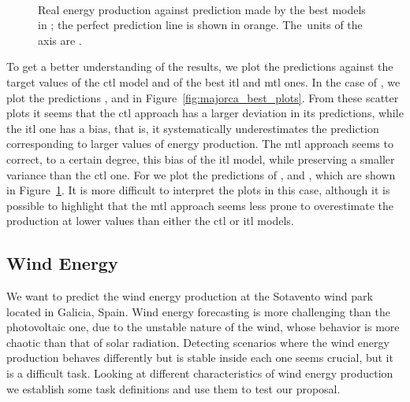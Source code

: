\begin{figure}[t!]
    \centering%
    \quad%
    \quad%
    \\
 \caption{\label{fig:tenerife_best_plots} Real energy production against prediction made by the best models {in} ; the perfect prediction  line is shown in orange. The~units of the axis are \mwhu{}.}
\end{figure}


%
To get a better understanding of the results, we plot the predictions against the target values of the \acrshort{ctl} model and of the best \acrshort{itl} and \acrshort{mtl} ones.
%
In the case of , we plot the predictions ,  and  in Figure~\ref{fig:majorca_best_plots}.
From these scatter plots it seems that the \acrshort{ctl} approach has a larger deviation in its predictions, while the \acrshort{itl} one has a bias, that is, it systematically underestimates the prediction corresponding to larger values of energy production.
The \acrshort{mtl} approach seems to correct, to a certain degree, this bias of the \acrshort{itl} model, while preserving a smaller variance than the \acrshort{ctl} one.
%
For  we plot the predictions of ,  and , which are shown in Figure~\ref{fig:tenerife_best_plots}.
It is more difficult to interpret the plots in this case, although it is possible to highlight that the \acrshort{mtl} approach seems less prone to overestimate the production at lower values than either the \acrshort{ctl} or \acrshort{itl} models.







\subsection{Wind Energy}
We want to predict the wind energy production at the Sotavento wind park located in Galicia, Spain.
Wind energy forecasting is more challenging than the photovoltaic one, due to the unstable nature of the wind, whose behavior is more chaotic than that of solar radiation. Detecting scenarios where the wind energy production behaves differently but is stable inside each one seems crucial, but it is a difficult task. Looking at different characteristics of wind energy production we establish some task definitions and use them to test our proposal. 

